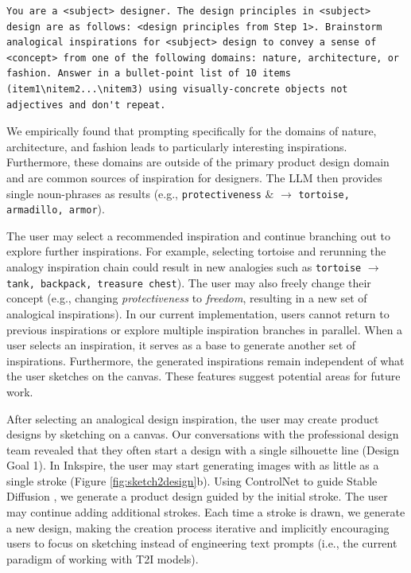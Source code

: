 \documentclass[sigconf, screen]{acmart}
\begin{document}
\begin{lstlisting}[style=prompt]
You are a <subject> designer. The design principles in <subject> design are as follows: <design principles from Step 1>. Brainstorm analogical inspirations for <subject> design to convey a sense of <concept> from one of the following domains: nature, architecture, or fashion. Answer in a bullet-point list of 10 items (item1\nitem2...\nitem3) using visually-concrete objects not adjectives and don't repeat.
\end{lstlisting}

We empirically found that prompting specifically for the domains of nature, architecture, and fashion leads to particularly interesting inspirations. 
Furthermore, these domains are outside of the primary product design domain and are common sources of inspiration for designers.
The LLM then provides single noun-phrases as results (e.g., \texttt{protectiveness} \& $\rightarrow$ \texttt{tortoise, armadillo, armor}).

The user may select a recommended inspiration and continue branching out to explore further inspirations.
For example, selecting tortoise and rerunning the analogy inspiration chain could result in new analogies such as \texttt{tortoise} $\rightarrow$ \texttt{tank, backpack, treasure chest}).
The user may also freely change their concept (e.g., changing \textit{protectiveness} to \textit{freedom}, resulting in a new set of analogical inspirations).
In our current implementation, users cannot return to previous inspirations or explore multiple inspiration branches in parallel. When a user selects an inspiration, it serves as a base to generate another set of inspirations. Furthermore, the generated inspirations remain independent of what the user sketches on the canvas. These features suggest potential areas for future work.

After selecting an analogical design inspiration, the user may create product designs by sketching on a canvas. 
Our conversations with the professional design team revealed that they often start a design with a single silhouette line (Design Goal 1).
In Inkspire, the user may start generating images with as little as a single stroke (Figure \ref{fig:sketch2design}b). Using ControlNet \cite{zhang2023adding} to guide Stable Diffusion \cite{rombach2022high}, we generate a product design guided by the initial stroke. The user may continue adding additional strokes. Each time a stroke is drawn, we generate a new design, making the creation process iterative and implicitly encouraging users to focus on sketching instead of engineering text prompts (i.e., the current paradigm of working with T2I models).
\end{document}
